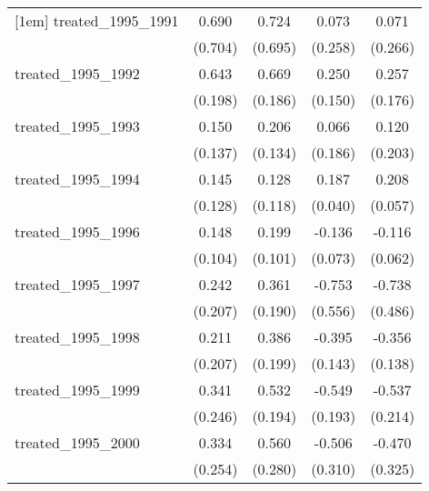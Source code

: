 {\begin{tabular}{l*{4}{c}}
[1em]
treated\_1995\_1991&       0.690         &       0.724         &       0.073         &       0.071         \\
            &     (0.704)         &     (0.695)         &     (0.258)         &     (0.266)         \\
[1em]
treated\_1995\_1992&       0.643\sym{**} &       0.669\sym{***}&       0.250         &       0.257         \\
            &     (0.198)         &     (0.186)         &     (0.150)         &     (0.176)         \\
[1em]
treated\_1995\_1993&       0.150         &       0.206         &       0.066         &       0.120         \\
            &     (0.137)         &     (0.134)         &     (0.186)         &     (0.203)         \\
[1em]
treated\_1995\_1994&       0.145         &       0.128         &       0.187\sym{***}&       0.208\sym{***}\\
            &     (0.128)         &     (0.118)         &     (0.040)         &     (0.057)         \\
[1em]
treated\_1995\_1996&       0.148         &       0.199\sym{*}  &      -0.136         &      -0.116         \\
            &     (0.104)         &     (0.101)         &     (0.073)         &     (0.062)         \\
[1em]
treated\_1995\_1997&       0.242         &       0.361         &      -0.753         &      -0.738         \\
            &     (0.207)         &     (0.190)         &     (0.556)         &     (0.486)         \\
[1em]
treated\_1995\_1998&       0.211         &       0.386         &      -0.395\sym{**} &      -0.356\sym{**} \\
            &     (0.207)         &     (0.199)         &     (0.143)         &     (0.138)         \\
[1em]
treated\_1995\_1999&       0.341         &       0.532\sym{**} &      -0.549\sym{**} &      -0.537\sym{*}  \\
            &     (0.246)         &     (0.194)         &     (0.193)         &     (0.214)         \\
[1em]
treated\_1995\_2000&       0.334         &       0.560\sym{*}  &      -0.506         &      -0.470         \\
            &     (0.254)         &     (0.280)         &     (0.310)         &     (0.325)         \\

\end{tabular}}
